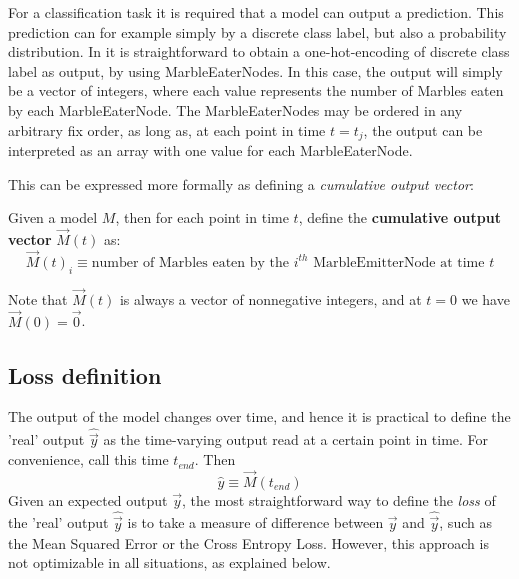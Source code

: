 For a classification task it is required that a model can output a prediction.
This prediction can for example simply by a discrete class label,
but also a probability distribution. 
In \nenwin it is straightforward to obtain a one-hot-encoding of discrete class label as output, by using MarbleEaterNodes.
In this case, the output will simply be a vector of integers, 
where each value represents the number of Marbles eaten by each MarbleEaterNode.
The MarbleEaterNodes may be ordered in any arbitrary fix order, as long as, at each point in time $t = t_j$, 
the output can be interpreted as an array with one value for each MarbleEaterNode.

This can be expressed more formally as defining a \textit{cumulative output vector}:
\begin{definition} \label{def:cumul_output_vect}
Given a \nenwin model $M$, then for each point in time $t$, define the \textbf{cumulative output vector} $\vec{M}(t)$ as:
\begin{equation}
    \vec{M}(t)_i \equiv \text{number of Marbles eaten by the $i^{th}$ MarbleEmitterNode at time $t$}
\end{equation}
\end{definition}
Note that $\vec{M}(t)$ is always a vector of nonnegative integers, and at $t = 0$ we have $\vec{M}(0) = \vec{0}$.


\subsection{Loss definition}
The output of the model changes over time, and hence it is practical to define the 'real' output $\hat{\vec{y}}$ as the time-varying output read at a certain point in time. For convenience, call this time $t_{end}$. Then \begin{equation}
    \hat{y} \equiv \vec{M}(t_{end})
\end{equation} Given an expected output $\vec{y}$, the most straightforward way to define the \textit{loss} of the 'real' output $\hat{\vec{y}}$ is to take a measure of difference between $\vec{y}$ and $\hat{\vec{y}}$, such as the Mean Squared Error or the Cross Entropy Loss. However, this approach is not optimizable in all situations, as explained below.

